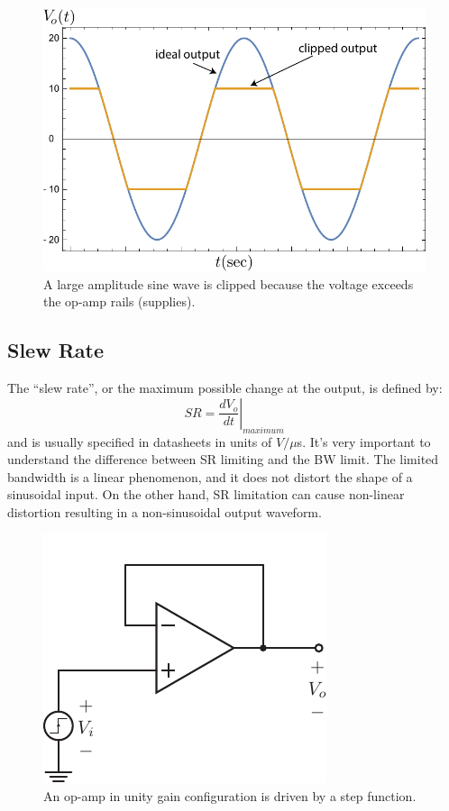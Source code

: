 \begin{figure}[tb]
\begin{center}
\includegraphics[width=.75\columnwidth]{sin_clip}
\end{center}
\caption{A large amplitude sine wave is clipped because the voltage exceeds the op-amp rails (supplies).} \label{fig:sin_clip}
\end{figure}




\subsection{Slew Rate}

The ``slew rate'', or the maximum possible change at the output, is defined by:
%
\begin{equation}
  SR = \left. \frac{dV_o}{dt} \right|_{maximum}
\end{equation}
% 
and is usually specified in datasheets in units of $V/\mu$s.  It's very important to understand the difference between SR limiting and the BW limit.  The limited bandwidth is a linear phenomenon, and it does not distort the shape of a sinusoidal input.  On the other hand, SR limitation can cause non-linear distortion resulting in a non-sinusoidal output waveform.



\begin{figure}[tb]
\begin{center}
\includegraphics[scale=1]{opamp_unitygain_step}
\end{center}
\caption{An op-amp in unity gain configuration is driven by a step function.} \label{fig:opamp_unitygain}
\end{figure}

